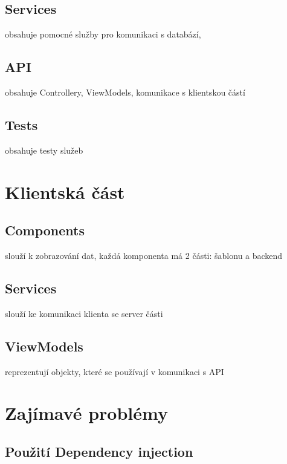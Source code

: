 \newpage

\subsection{Services}

obsahuje pomocné služby pro komunikaci s databází, 

\subsection{API}

obsahuje Controllery, ViewModels, komunikace s klientskou částí

\subsection{Tests}

obsahuje testy služeb

\section{Klientská část}

\subsection{Components}

slouží k zobrazování dat, každá komponenta má 2 části: šablonu a backend

\subsection{Services}

slouží ke komunikaci klienta se server části

\subsection{ViewModels}

reprezentují objekty, které se používají v komunikaci s API

\section{Zajímavé problémy}

\subsection{Použití Dependency injection}

